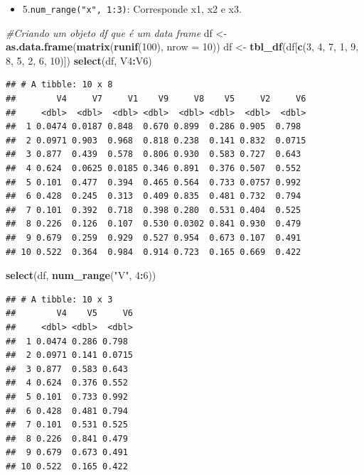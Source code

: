 \documentclass[]{book}
\newenvironment{Shaded}{\begin{snugshade}}{\end{snugshade}}
\newcommand{\CommentTok}[1]{\textcolor[rgb]{0.56,0.35,0.01}{\textit{#1}}}
\newcommand{\DataTypeTok}[1]{\textcolor[rgb]{0.13,0.29,0.53}{#1}}
\newcommand{\DecValTok}[1]{\textcolor[rgb]{0.00,0.00,0.81}{#1}}
\newcommand{\KeywordTok}[1]{\textcolor[rgb]{0.13,0.29,0.53}{\textbf{#1}}}
\newcommand{\NormalTok}[1]{#1}
\newcommand{\OperatorTok}[1]{\textcolor[rgb]{0.81,0.36,0.00}{\textbf{#1}}}
\newcommand{\StringTok}[1]{\textcolor[rgb]{0.31,0.60,0.02}{#1}}
\providecommand{\tightlist}{%
  \setlength{\itemsep}{0pt}\setlength{\parskip}{0pt}}
\begin{document}
\begin{itemize}
\tightlist
\item
  5.\texttt{num\_range("x",\ 1:3)}: Corresponde x1, x2 e x3.
\end{itemize}

\begin{Shaded}
\begin{Highlighting}[]
\CommentTok{#Criando um objeto df que é um data frame}
\NormalTok{df <-}\StringTok{ }\KeywordTok{as.data.frame}\NormalTok{(}\KeywordTok{matrix}\NormalTok{(}\KeywordTok{runif}\NormalTok{(}\DecValTok{100}\NormalTok{), }\DataTypeTok{nrow =} \DecValTok{10}\NormalTok{)) }
\NormalTok{df <-}\StringTok{ }\KeywordTok{tbl_df}\NormalTok{(df[}\KeywordTok{c}\NormalTok{(}\DecValTok{3}\NormalTok{, }\DecValTok{4}\NormalTok{, }\DecValTok{7}\NormalTok{, }\DecValTok{1}\NormalTok{, }\DecValTok{9}\NormalTok{, }\DecValTok{8}\NormalTok{, }\DecValTok{5}\NormalTok{, }\DecValTok{2}\NormalTok{, }\DecValTok{6}\NormalTok{, }\DecValTok{10}\NormalTok{)])}
\KeywordTok{select}\NormalTok{(df, V4}\OperatorTok{:}\NormalTok{V6)}
\end{Highlighting}
\end{Shaded}

\begin{verbatim}
## # A tibble: 10 x 8
##        V4     V7     V1    V9     V8    V5     V2     V6
##     <dbl>  <dbl>  <dbl> <dbl>  <dbl> <dbl>  <dbl>  <dbl>
##  1 0.0474 0.0187 0.848  0.670 0.899  0.286 0.905  0.798 
##  2 0.0971 0.903  0.968  0.818 0.238  0.141 0.832  0.0715
##  3 0.877  0.439  0.578  0.806 0.930  0.583 0.727  0.643 
##  4 0.624  0.0625 0.0185 0.346 0.891  0.376 0.507  0.552 
##  5 0.101  0.477  0.394  0.465 0.564  0.733 0.0757 0.992 
##  6 0.428  0.245  0.313  0.409 0.835  0.481 0.732  0.794 
##  7 0.101  0.392  0.718  0.398 0.280  0.531 0.404  0.525 
##  8 0.226  0.126  0.107  0.530 0.0302 0.841 0.930  0.479 
##  9 0.679  0.259  0.929  0.527 0.954  0.673 0.107  0.491 
## 10 0.522  0.364  0.984  0.914 0.723  0.165 0.669  0.422
\end{verbatim}

\begin{Shaded}
\begin{Highlighting}[]
\KeywordTok{select}\NormalTok{(df, }\KeywordTok{num_range}\NormalTok{(}\StringTok{"V"}\NormalTok{, }\DecValTok{4}\OperatorTok{:}\DecValTok{6}\NormalTok{))}
\end{Highlighting}
\end{Shaded}

\begin{verbatim}
## # A tibble: 10 x 3
##        V4    V5     V6
##     <dbl> <dbl>  <dbl>
##  1 0.0474 0.286 0.798 
##  2 0.0971 0.141 0.0715
##  3 0.877  0.583 0.643 
##  4 0.624  0.376 0.552 
##  5 0.101  0.733 0.992 
##  6 0.428  0.481 0.794 
##  7 0.101  0.531 0.525 
##  8 0.226  0.841 0.479 
##  9 0.679  0.673 0.491 
## 10 0.522  0.165 0.422
\end{verbatim}
\end{document}
